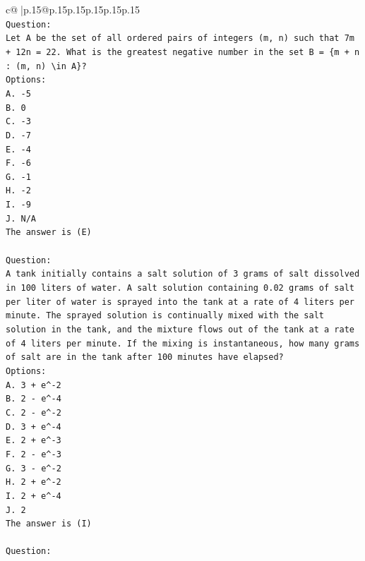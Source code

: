 \documentclass{article}
\begin{document}
{\begin{supertabular}{c@{$\;$}|p{.15\linewidth}@{}p{.15\linewidth}p{.15\linewidth}p{.15\linewidth}p{.15\linewidth}p{.15\linewidth}}
{{{\\ 
\texttt{Question:} \\
\texttt{Let A be the set of all ordered pairs of integers (m, n) such that 7m + 12n = 22. What is the greatest negative number in the set B = \{m + n : (m, n) \textbackslash{}in A\}?} \\
\texttt{Options:} \\
\texttt{A. {-}5} \\
\texttt{B. 0} \\
\texttt{C. {-}3} \\
\texttt{D. {-}7} \\
\texttt{E. {-}4} \\
\texttt{F. {-}6} \\
\texttt{G. {-}1} \\
\texttt{H. {-}2} \\
\texttt{I. {-}9} \\
\texttt{J. N/A} \\
\texttt{The answer is (E)} \\
\\ 
\texttt{Question:} \\
\texttt{A tank initially contains a salt solution of 3 grams of salt dissolved in 100 liters of water. A salt solution containing 0.02 grams of salt per liter of water is sprayed into the tank at a rate of 4 liters per minute. The sprayed solution is continually mixed with the salt solution in the tank, and the mixture flows out of the tank at a rate of 4 liters per minute. If the mixing is instantaneous, how many grams of salt are in the tank after 100 minutes have elapsed?} \\
\texttt{Options:} \\
\texttt{A. 3 + e\^{}{-}2} \\
\texttt{B. 2 {-} e\^{}{-}4} \\
\texttt{C. 2 {-} e\^{}{-}2} \\
\texttt{D. 3 + e\^{}{-}4} \\
\texttt{E. 2 + e\^{}{-}3} \\
\texttt{F. 2 {-} e\^{}{-}3} \\
\texttt{G. 3 {-} e\^{}{-}2} \\
\texttt{H. 2 + e\^{}{-}2} \\
\texttt{I. 2 + e\^{}{-}4} \\
\texttt{J. 2} \\
\texttt{The answer is (I)} \\
\\ 
\texttt{Question:} \\
}}}
\end{supertabular}}
\end{document}
